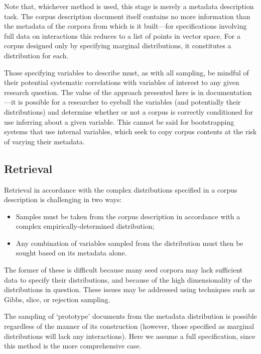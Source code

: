 Note that, whichever method is used, this stage is merely a metadata description task.  The corpus description document itself contains no more information than the metadata of the corpora from which is it built---for specifications involving full data on interactions this reduces to a list of points in vector space.  For a corpus designed only by specifying marginal distributions, it constitutes a distribution for each.

Those specifying variables to describe must, as with all sampling, be mindful of their potential systematic correlations with variables of interest to any given research question.  The value of the approach presented here is in documentation---it is possible for a researcher to eyeball the variables (and potentially their distributions) and determine whether or not a corpus is correctly conditioned for use inferring about a given variable.  This cannot be said for bootstrapping systems that use internal variables, which seek to copy corpus contents at the risk of varying their metadata.


\subsection{Retrieval}
Retrieval in accordance with the complex distributions specified in a corpus description is challenging in two ways:

\begin{itemize}
    \item Samples must be taken from the corpus description in accordance with a complex empirically-determined distribution;
    \item Any combination of variables sampled from the distribution must then be sought based on its metadata alone.
\end{itemize}

The former of these is difficult because many seed corpora may lack sufficient data to specify their distributions, and because of the high dimensionality of the distributions in question.  These issues may be addressed using techniques such as Gibbs, slice, or rejection sampling.

The sampling of `prototype' documents from the metadata distribution is possible regardless of the manner of its construction (however, those specified as marginal distributions will lack any interactions).  Here we assume a full specification, since this method is the more comprehensive case.

